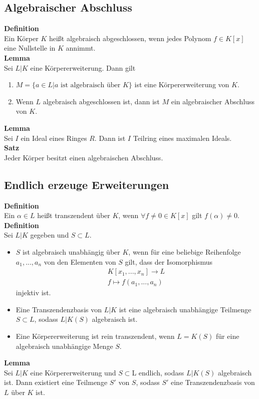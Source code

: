 \documentclass[a4paper, 12pt]{article}
\begin{document}
\subsection{Algebraischer Abschluss}
\textbf{Definition}\\
Ein Körper $K$ heißt algebraisch abgeschlossen, wenn jedes Polynom $f \in K[x]$ eine Nullstelle in $K$ annimmt.\\
\textbf{Lemma}\\
Sei $L|K$ eine Körpererweiterung. Dann gilt \begin{enumerate}
	\item $M = \{a \in L | a\text{ ist algebraisch über } K\}$ ist eine Körpererweiterung von $K$.
	\item Wenn $L$ algebraisch abgeschlossen ist, dann ist $M$ ein algebraischer Abschluss von $K$.
\end{enumerate}
\textbf{Lemma}\\
Sei $I$ ein Ideal eines Ringes $R$. Dann ist $I$ Teilring eines maximalen Ideals.\\
\textbf{Satz}\\
Jeder Körper besitzt einen algebraischen Abschluss.
\subsection{Endlich erzeuge Erweiterungen}
\textbf{Definition}\\
Ein $\alpha \in L$ heißt transzendent über $K$, wenn $\forall f\neq 0 \in K[x]$ gilt $f(\alpha) \neq 0$.\\
\textbf{Definition}\\
Sei $L|K$ gegeben und $S\subset L$.
\begin{itemize}
	\item $S$ ist algebraisch unabhängig über $K$, wenn für eine beliebige Reihenfolge $a_1,...,a_n$ von den Elementen von $S$ gilt, dass der Isomorphismus \begin{align*}
		K[x_1,...,x_n] \to L\\
		f \mapsto f(a_1,...,a_n)
	\end{align*}
	injektiv ist.
	\item Eine Transzendenzbasis von $L|K$ ist eine algebraisch unabhängige Teilmenge $S\subset L$, sodass $L|K(S)$ algebraisch ist.
	\item Eine Körpererweiterung ist rein transzendent, wenn $L=K(S)$ für eine algebraisch unabhängige Menge $S$. 
\end{itemize}
\textbf{Lemma}\\
Sei $L|K$ eine Körpererweiterung und $S \subset $L endlich, sodass $L|K(S)$ algebraisch ist. Dann existiert eine Teilmenge $S'$ von $S$, sodass $S'$ eine Transzendenzbasis von $L$ über $K$ ist.\\
\end{document}
